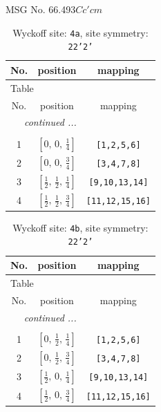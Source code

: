 \documentclass[fleqn,8pt]{jsarticle}
\begin{document}
\setcounter{MaxMatrixCols}{32}

\renewcommand{\tablename}{Table~}
\renewcommand{\figurename}{Figure~}
\begin{center}
\LARGE
MSG No. 66.493\quad$Cc'cm$
\end{center}
\renewcommand{\arraystretch}{1.2}
\begin{longtable}{ccc}
\caption{Wyckoff site: {\tt 4a}, site symmetry: {\tt 22'2'}}
 \\
 \hline \hline
No. & position & mapping \\ \hline \endfirsthead

\multicolumn{2}{l}{\tablename\ \thetable{}} \\
 \hline \hline
No. & position & mapping \\ \hline \endhead

 \hline \hline
\multicolumn{2}{r}{\footnotesize\it continued ...} \\ \endfoot

 \hline \hline
\multicolumn{2}{r}{} \\ \endlastfoot

1 & $\left[ 0,\, 0,\, \frac{1}{4} \right]$ & {\tt [1,2,5,6]} \\ \hline
2 & $\left[ 0,\, 0,\, \frac{3}{4} \right]$ & {\tt [3,4,7,8]} \\ \hline
3 & $\left[ \frac{1}{2},\, \frac{1}{2},\, \frac{1}{4} \right]$ & {\tt [9,10,13,14]} \\ \hline
4 & $\left[ \frac{1}{2},\, \frac{1}{2},\, \frac{3}{4} \right]$ & {\tt [11,12,15,16]} \\
\end{longtable}
\renewcommand{\arraystretch}{1.2}
\begin{longtable}{ccc}
\caption{Wyckoff site: {\tt 4b}, site symmetry: {\tt 22'2'}}
 \\
 \hline \hline
No. & position & mapping \\ \hline \endfirsthead

\multicolumn{2}{l}{\tablename\ \thetable{}} \\
 \hline \hline
No. & position & mapping \\ \hline \endhead

 \hline \hline
\multicolumn{2}{r}{\footnotesize\it continued ...} \\ \endfoot

 \hline \hline
\multicolumn{2}{r}{} \\ \endlastfoot

1 & $\left[ 0,\, \frac{1}{2},\, \frac{1}{4} \right]$ & {\tt [1,2,5,6]} \\ \hline
2 & $\left[ 0,\, \frac{1}{2},\, \frac{3}{4} \right]$ & {\tt [3,4,7,8]} \\ \hline
3 & $\left[ \frac{1}{2},\, 0,\, \frac{1}{4} \right]$ & {\tt [9,10,13,14]} \\ \hline
4 & $\left[ \frac{1}{2},\, 0,\, \frac{3}{4} \right]$ & {\tt [11,12,15,16]} \\
\end{longtable}
\end{document}
